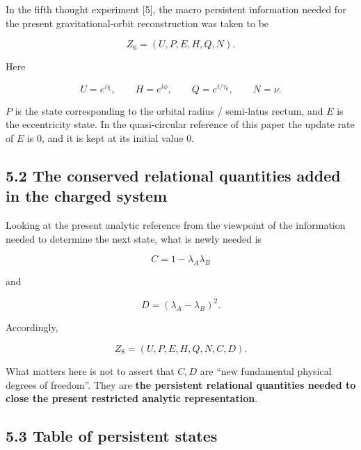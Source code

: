 \documentclass[
  a4paper,
]{article}
\begin{document}
In the fifth thought experiment {[}5{]}, the macro persistent
information needed for the present gravitational-orbit reconstruction
was taken to be

\[
Z_6=(U,P,E,H,Q,N).
\]

Here

\[
U=e^{i\chi},
\qquad
H=e^{i\phi},
\qquad
Q=e^{t/\tau_0},
\qquad
N=\nu.
\]

\(P\) is the state corresponding to the orbital radius / semi-latus
rectum, and \(E\) is the eccentricity state. In the quasi-circular
reference of this paper the update rate of \(E\) is 0, and it is kept at
its initial value 0.

\subsection{5.2 The conserved relational quantities added in the charged
system}\label{the-conserved-relational-quantities-added-in-the-charged-system}

Looking at the present analytic reference from the viewpoint of the
information needed to determine the next state, what is newly needed is

\[
C=1-\lambda_A\lambda_B
\]

and

\[
D=(\lambda_A-\lambda_B)^2.
\]

Accordingly,

\[
\boxed{
Z_8=(U,P,E,H,Q,N,C,D).
}
\]

What matters here is not to assert that \(C,D\) are ``new fundamental
physical degrees of freedom''. They are \textbf{the persistent
relational quantities needed to close the present restricted analytic
representation}.

\subsection{5.3 Table of persistent
states}\label{table-of-persistent-states}
\end{document}
